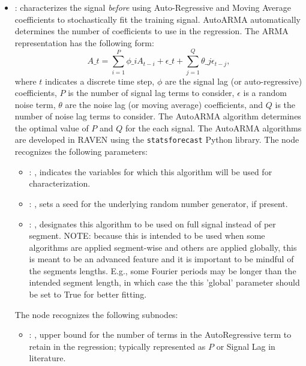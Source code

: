 \begin{itemize}
    \item {}:
      characterizes the signal \textit{before} using Auto-Regressive and         Moving Average
      coefficients to stochastically fit the training signal. AutoARMA         automatically
      determines the number of coefficients to use in the regression.         The ARMA
      representation has the following form:         \begin{equation*}           A\_t = \sum_{i=1}^P
      \phi\_i A_{t-i} + \epsilon\_t + \sum_{j=1}^Q \theta\_j \epsilon_{t-j},         \end{equation*}
      where $t$ indicates a discrete time step, $\phi$ are the signal lag (or auto-regressive)
      coefficients, $P$ is the number of signal lag terms to consider, $\epsilon$ is a random noise
      term, $\theta$ are the noise lag (or moving average) coefficients, and $Q$ is the number of
      noise lag terms to consider. The AutoARMA algorithm determines the optimal value of $P$
      and $Q$ for the each signal. The AutoARMA algorithms are developed in RAVEN using the
      \texttt{statsforecast} Python library.
      The  node recognizes the following parameters:
        \begin{itemize}
          \item {}: ,
            indicates the variables for which this algorithm will be used for characterization.
          \item {}: ,
            sets a seed for the underlying random number generator, if present.
          \item {}: ,
            designates this algorithm to be used on full signal instead of per
            segment. NOTE: because this is intended to be used when some algorithms are
            applied segment-wise and others are applied globally, this is meant to be an
            advanced feature and it is important to be mindful of the segments lengths.
            E.g., some Fourier periods may be longer than the intended segment length, in
            which case the this 'global' parameter should be set to True for better
            fitting. 
      \end{itemize}

      The  node recognizes the following subnodes:
      \begin{itemize}
        \item {}: ,
          upper bound for the number of terms in the AutoRegressive term to retain
          in the regression; typically represented as $P$ or Signal Lag in
          literature.


\end{itemize}
\end{itemize}
